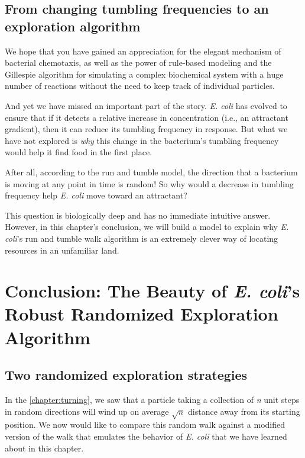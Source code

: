 \FloatBarrier
{}
\subsection{From changing tumbling frequencies to an exploration algorithm}

We hope that you have gained an appreciation for the elegant mechanism of bacterial chemotaxis, as well as the power of rule-based modeling and the Gillespie algorithm for simulating a complex biochemical system with a huge number of reactions without the need to keep track of individual particles.

And yet we have missed an important part of the story. \textit{E. coli} has evolved to ensure that if it detects a relative increase in concentration (i.e., an attractant gradient), then it can reduce its tumbling frequency in response. But what we have not explored is \textit{why} this change in the bacterium's tumbling frequency would help it find food in the first place.

After all, according to the run and tumble model, the direction that a bacterium is moving at any point in time is random! So why would a decrease in tumbling frequency help \textit{E. coli} move toward an attractant?

This question is biologically deep and has no immediate intuitive answer. However, in this chapter's conclusion, we will build a model to explain why \textit{E. coli}'s run and tumble walk algorithm is an extremely clever way of locating resources in an unfamiliar land.


\FloatBarrier
{}

\section{Conclusion: The Beauty of \textit{E. coli}'s Robust Randomized Exploration Algorithm}
\label{sec:conclusion}

\subsection{Two randomized exploration strategies}


In the \autoref{chapter:turning}, we saw that a particle taking a collection of \textit{n} unit steps in random directions will wind up on average $\sqrt{n}$ distance away from its starting position. We now would like to compare this random walk against a modified version of the walk that emulates the behavior of \textit{E. coli} that we have learned about in this chapter.

